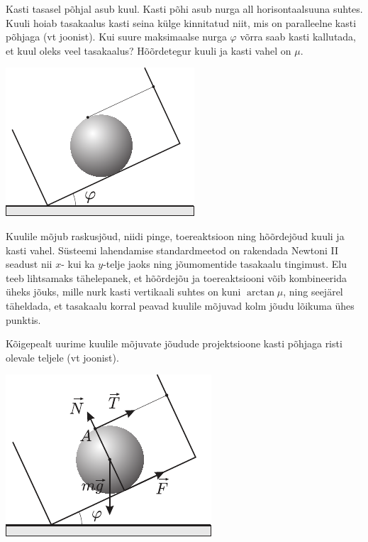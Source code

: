 
Kasti tasasel põhjal asub kuul. Kasti põhi asub nurga all horisontaalsuuna suhtes. Kuuli hoiab tasakaalus kasti seina külge kinnitatud niit, mis on paralleelne kasti põhjaga (vt joonist). Kui suure maksimaalse nurga $\varphi$ võrra saab kasti kallutada, et kuul oleks veel tasakaalus? Hõõrdetegur kuuli ja kasti vahel on $\mu$.

\begin{center}
	\includegraphics[width=0.5\linewidth]{2006-lahg-07-yl}
\end{center}

\hint
Kuulile mõjub raskusjõud, niidi pinge, toereaktsioon ning hõõrdejõud kuuli ja kasti vahel. Süsteemi lahendamise standardmeetod on rakendada Newtoni II seadust nii $x$- kui ka $y$-telje jaoks ning jõumomentide tasakaalu tingimust. Elu teeb lihtsamaks tähelepanek, et hõõrdejõu ja toereaktsiooni võib kombineerida üheks jõuks, mille nurk kasti vertikaali suhtes on kuni $\arctan\mu$, ning seejärel täheldada, et tasakaalu korral peavad kuulile mõjuvad kolm jõudu lõikuma ühes punktis.

\solu
Kõigepealt uurime kuulile mõjuvate jõudude projektsioone kasti põhjaga risti olevale teljele (vt joonist).

\begin{center}
	\includegraphics[width=0.5\linewidth]{2006-lahg-07-lah}
\end{center}

